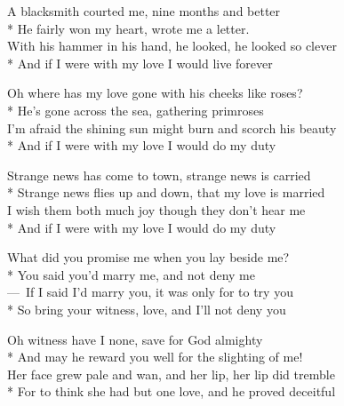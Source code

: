 

\versemark
A blacksmith courted me, nine months and better\\*
He fairly won my heart, wrote me a letter.\\
With his hammer in his hand, he looked, he looked so clever\\*
And if I were with my love I would live forever

\versemark
Oh where has my love gone with his cheeks like roses?\\*
He’s gone across the sea, gathering primroses\\
I’m afraid the shining sun might burn and scorch his beauty\\*
And if I were with my love I would do my duty

\versemark
Strange news has come to town, strange news is carried\\*
Strange news flies up and down, that my love is married\\
I wish them both much joy though they don’t hear me\\*
And if I were with my love I would do my duty

\versemark
What did you promise me when you lay beside me?\\*
You said you’d marry me, and not deny me\\
— If I said I’d marry you, it was only for to try you\\*
So bring your witness, love, and I’ll not deny you

\versemark
Oh witness have I none, save for God almighty\\*
And may he reward you well for the slighting of me!\\
Her face grew pale and wan, and her lip, her lip did tremble\\*
For to think she had but one love, and he proved deceitful

